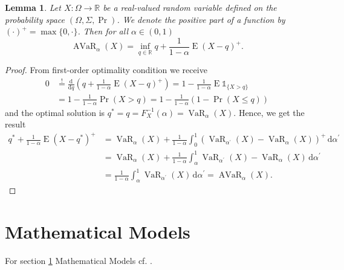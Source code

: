 \documentclass[a4paper, english, 11pt, onecolumn, oneside, final]{article}
\numberwithin{equation}{section}   %
\DeclareMathOperator{\E}{\mathrm{E}}	    %
\DeclareMathOperator{\VaR}{\mathrm{VaR}}	%
\DeclareMathOperator{\AVaR}{\mathrm{AVaR}}	%
\newcommand{\R}{\mathbb{R}}                 %
\newcommand{\one}{\mathds 1}
\theoremstyle{plain}
\newtheorem{lemma}      [theorem]{Lemma}
\theoremstyle{definition}
\theoremstyle{remark}
\begin{document}
\begin{lemma}\label{lemma:AVaR} Let $X\colon\Omega\to\R$ be a real-valued random variable defined on the probability space $(\Omega,\Sigma,\Pr)$. We denote the positive part of a function by $(\cdot)^+=\max\{0,\cdot\}$. Then for all $\alpha\in(0,1)$
    \begin{equation*}
        \AVaR_\alpha(X) = \inf_{q\in\R}q+\frac{1}{1-\alpha}\E(X-q)^+.
    \end{equation*}
\end{lemma}
\begin{proof}
    From first-order optimality condition we receive
    \begin{equation*}
        \begin{aligned}
            0 &\overset{!}{=} \frac{\mathrm{d}}{\mathrm{d}q}\left(q+\frac{1}{1-\alpha}\E(X-q)^+\right)
            = 1 - \frac{1}{1-\alpha}\E\one_{\{X>q\}} \\
            &= 1 - \frac{1}{1-\alpha}\Pr(X>q)
            = 1 - \frac{1}{1-\alpha}(1-\Pr(X\leq q))
        \end{aligned}
    \end{equation*}
    and the optimal solution is $q^* = q = F_X^{-1}(\alpha) = \VaR_\alpha(X)$. Hence, we get the result
    \begin{equation*}
        \begin{aligned}
            q^* + \frac{1}{1-\alpha}\E(X-q^*)^+
            &= \VaR_\alpha(X) + \frac{1}{1-\alpha}\int_0^1(\VaR_{\alpha^\prime}(X)-\VaR_\alpha(X))^+\,\mathrm{d}\alpha^\prime \\
            &= \VaR_\alpha(X) + \frac{1}{1-\alpha}\int_\alpha^1\VaR_{\alpha^\prime}(X)-\VaR_\alpha(X)\,\mathrm{d}\alpha^\prime \\
            &= \frac{1}{1-\alpha}\int_\alpha^1\VaR_{\alpha^\prime}(X)\,\mathrm{d}\alpha^\prime
            = \AVaR_\alpha(X).
        \end{aligned}
    \end{equation*}
\end{proof}
\section{Mathematical Models}\label{section:MathematicalModels}
For section \ref{section:MathematicalModels} Mathematical Models cf. \citet[pp.~23,24,27,32,52]{PichlerPortfoliooptimierung}.
\end{document}
